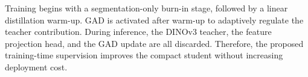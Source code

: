 Training begins with a segmentation-only burn-in stage, followed by a linear distillation warm-up. GAD is activated after warm-up to adaptively regulate the teacher contribution. During inference, the DINOv3 teacher, the feature projection head, and the GAD update are all discarded. Therefore, the proposed training-time supervision improves the compact student without increasing deployment cost.








